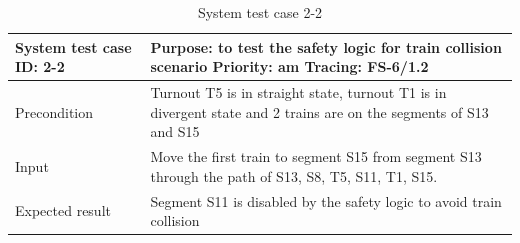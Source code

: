 \begin{table}[H]
	\caption{System test case 2-2}
	\label{table:TCase-FSS2-2}
	\begin{center}
		\renewcommand{\arraystretch}{1.8}
		\begin{tabu} 
			to 0.9 \textwidth
			{  X[0.3, l] X[l] }
			\toprule
			System test case ID: 2-2 & Purpose: to test the safety logic for train collision scenario \newline Priority: am \newline Tracing: FS-6/1.2   \\ \midrule
			Precondition             & Turnout T5 is in straight state, turnout T1 is in divergent state and 2 trains are on the segments of S13 and S15 \\
			Input                    & Move the first train to segment S15 from segment S13 through the path of S13, S8, T5, S11, T1, S15.               \\
			Expected result          & Segment S11 is disabled by the safety logic to avoid train collision                                              \\ \bottomrule
		\end{tabu}
	\end{center}
\end{table}